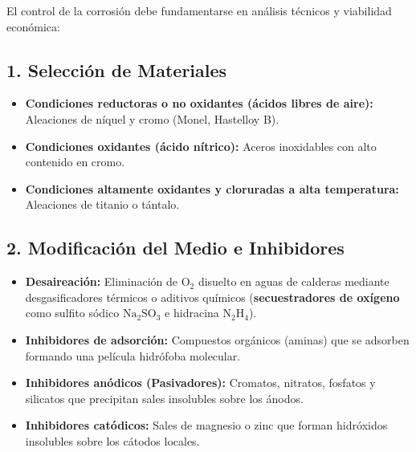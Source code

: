 El control de la corrosión debe fundamentarse en análisis técnicos y viabilidad económica:

\subsection{1. Selección de Materiales}
\begin{itemize}
    \item \textbf{Condiciones reductoras o no oxidantes (ácidos libres de aire):} Aleaciones de níquel y cromo (Monel, Hastelloy B).
    \item \textbf{Condiciones oxidantes (ácido nítrico):} Aceros inoxidables con alto contenido en cromo.
    \item \textbf{Condiciones altamente oxidantes y cloruradas a alta temperatura:} Aleaciones de titanio o tántalo.
\end{itemize}

\subsection{2. Modificación del Medio e Inhibidores}
\begin{itemize}
    \item \textbf{Desaireación:} Eliminación de $\text{O}_2$ disuelto en aguas de calderas mediante desgasificadores térmicos o aditivos químicos (\textbf{secuestradores de oxígeno} como sulfito sódico $\text{Na}_2\text{SO}_3$ e hidracina $\text{N}_2\text{H}_4$).
    \item \textbf{Inhibidores de adsorción:} Compuestos orgánicos (aminas) que se adsorben formando una película hidrófoba molecular.
    \item \textbf{Inhibidores anódicos (Pasivadores):} Cromatos, nitratos, fosfatos y silicatos que precipitan sales insolubles sobre los ánodos.
    \item \textbf{Inhibidores catódicos:} Sales de magnesio o zinc que forman hidróxidos insolubles sobre los cátodos locales.
\end{itemize}

